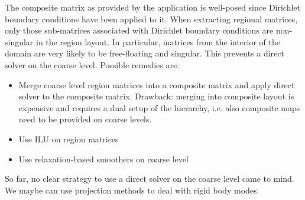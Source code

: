 \documentclass[11pt]{article}
\begin{document}
The composite matrix as provided by the application is well-posed since Dirichlet boundary conditions have been applied to it. 
When extracting regional matrices, only those sub-matrices associated with Dirichlet boundary conditions are non-singular
in the region layout. In particular, matrices from the interior of the domain are very likely to be free-floating and singular. 
This prevents a direct solver on the coarse level. Possible remedies are:
\begin{itemize}
\item Merge coarse level region matrices into a composite matrix and apply direct solver to the composite matrix. 
Drawback: merging into composite layout is expensive and requires a dual setup of the hierarchy, 
i.e. also composite maps need to be provided on coarse levels.
\item Use ILU on region matrices
\item Use relaxation-based smoothers on coarse level
\end{itemize}
So far, no clear strategy to use a direct solver on the coarse level came to mind. 
We maybe can use projection methods to deal with rigid body modes.
\end{document}
